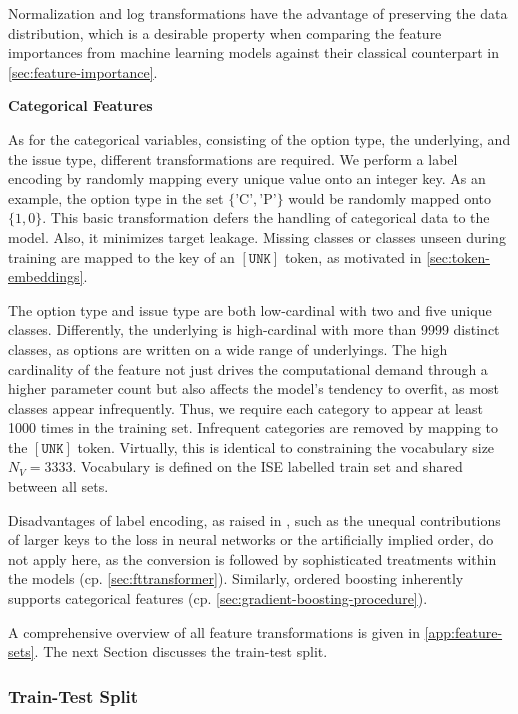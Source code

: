 Normalization and log transformations have the advantage of preserving the data distribution, which is a desirable property when comparing the feature importances from machine learning models against their classical counterpart in \cref{sec:feature-importance}.

\textbf{Categorical Features}

As for the categorical variables, consisting of the option type, the underlying, and the issue type, different transformations are required. We perform a label encoding by randomly mapping every unique value onto an integer key. As an example, the option type in the set $\{\text{'C'},\text{'P'}\}$ would be randomly mapped onto $\{1,0\}$. This basic transformation defers the handling of categorical data to the model. Also, it minimizes target leakage. Missing classes or classes unseen during training are mapped to the key of an $\mathtt{[UNK]}$ token, as motivated in \cref{sec:token-embeddings}.

The option type and issue type are both low-cardinal with two and five unique classes. Differently, the underlying is high-cardinal with more than \num{9999} distinct classes, as options are written on a wide range of underlyings. The high cardinality of the feature not just drives the computational demand through a higher parameter count but also affects the model's tendency to overfit, as most classes appear infrequently. Thus, we require each category to appear at least \num{1000} times in the training set. Infrequent categories are removed by mapping to the $\mathtt{[UNK]}$ token. Virtually, this is identical to constraining the vocabulary size $N_V = \num{3333}$. Vocabulary is defined on the \gls{ISE} labelled train set and shared between all sets.

Disadvantages of label encoding, as raised in \textcite[][12]{hancockSurveyCategoricalData2020}, such as the unequal contributions of larger keys to the loss in neural networks or the artificially implied order, do not apply here, as the conversion is followed by sophisticated treatments within the models (cp. \cref{sec:fttransformer}). Similarly, ordered boosting inherently supports categorical features (cp. \cref{sec:gradient-boosting-procedure}).

A comprehensive overview of all feature transformations is given in \cref{app:feature-sets}. The next Section discusses the train-test split.

\subsubsection{Train-Test Split}\label{sec:train-test-split}

